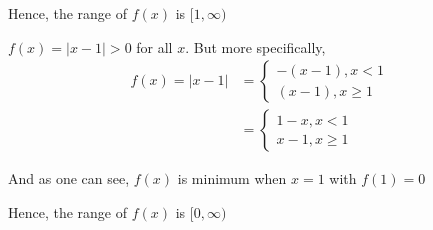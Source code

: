 \documentclass[14pt,fleqn]{extarticle}
\newcommand\fx{\vert x-1\vert}
\begin{document}
\begin{question}
\begin{step}
\begin{options}
Hence, the range of $f(x)$ is $[1,\infty)$ 


	\end{options}
	\reason

$f(x) = \fx > 0$ for all $x$. But more specifically, 
	\begin{align}
	f(x) = \vert x-1\vert &= \begin{cases}
       -(x-1), x< 1 \\
       (x-1), x\geq 1
     \end{cases} \\
     &= \begin{cases}
       1-x, x< 1 \\
       x-1, x\geq 1
     \end{cases} 
\end{align}
     
     And as one can see, $f(x)$ is minimum when $x=1$ with $f(1) = 0$\newline
     
     Hence, the range of $f(x)$ is $[0,\infty)$
     
\end{step}
\end{question}
\end{document}
